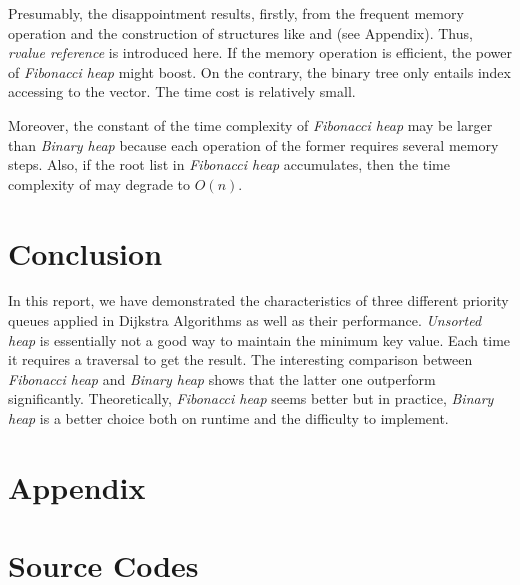 Presumably, the disappointment results, firstly, from the frequent memory operation and the construction of structures like  and  (see Appendix). Thus, \emph{rvalue reference} is introduced here. If the memory operation is efficient, the power of \emph{Fibonacci heap} might boost. On the contrary, the binary tree only entails index accessing to the vector. The time cost is relatively small.

Moreover, the constant of the time complexity of \emph{Fibonacci heap} may be larger than \emph{Binary heap} because each operation of the former requires several memory steps. Also, if the root list in \emph{Fibonacci heap} accumulates, then the time complexity of  may degrade to $O(n)$.


\section{Conclusion}
In this report, we have demonstrated the characteristics of three different priority queues applied in Dijkstra Algorithms as well as their performance. \emph{Unsorted heap} is essentially not a good way to maintain the minimum key value. Each time it requires a traversal to get the result. The interesting comparison between \emph{Fibonacci heap} and \emph{Binary heap} shows that the latter one outperform significantly. Theoretically, \emph{Fibonacci heap} seems better but in practice, \emph{Binary heap} is a better choice both on runtime and the difficulty to implement.

\clearpage
\section{Appendix}
\appendix
\section{Source Codes}
